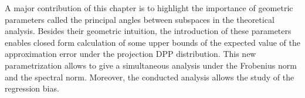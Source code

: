 \documentclass[twoside,11pt]{book}
\newtheorem{theorem}{Theorem}
\numberwithin{theorem}{chapter}
\numberwithin{definition}{chapter}
\numberwithin{proposition}{chapter}
\numberwithin{corollary}{chapter}
\numberwithin{example}{chapter}
\numberwithin{lemma}{chapter}
\numberwithin{assumption}{chapter}
\numberwithin{equation}{chapter}
\numberwithin{figure}{chapter}
\DeclareMathOperator{\Det}{Det}
\DeclareMathOperator{\Fr}{\mathrm{Fr}}
\DeclareMathOperator{\VS}{\mathrm{VS}}
\DeclareMathOperator{\Tran}{\intercal}
\DeclareMathOperator{\EX}{\mathbb{E}}
\DeclareMathOperator{\Prb}{\mathbb{P}}
\begin{document}
A major contribution of this chapter is to highlight the importance of geometric parameters called the principal angles between subspaces in the theoretical analysis. Besides their geometric intuition, the introduction of these parameters enables closed form calculation of some upper bounds of the expected value of the approximation error under the projection DPP distribution.
This new parametrization allows to give a simultaneous analysis under the Frobenius norm and the spectral norm. Moreover, the conducted analysis allows the study of the  regression bias.







\end{document}
